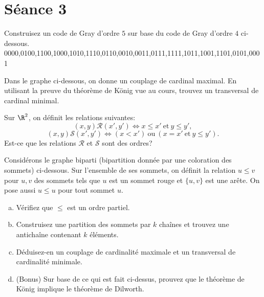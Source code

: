 
\section{Séance 3}

\vspace*{1cm}

\begin{exo}
Construisez un code de Gray d'ordre $5$ sur base du code de Gray d'ordre $4$ ci-dessous.\\
0000,0100,1100,1000,1010,1110,0110,0010,0011,0111,1111,1011,1001,1101,0101,0001
\end{exo}

\vspace*{1cm}


\begin{exo}
Dans le graphe ci-dessous, on donne un couplage de cardinal maximal. En utilisant la preuve du th\'eor\`eme de K\"onig vue au cours, trouvez un transversal de cardinal minimal.
\end{exo}

\begin{figure}[!h]
\begin{center}

\end{center}
\caption{}
\end{figure}


\begin{exo}
Sur $\R^2$, on d\'efinit les relations suivantes:
$$(x,y)\mathcal{R}(x',y') \Leftrightarrow x \leq x' \mathrm{~et~} y \leq y', $$
$$(x,y)\mathcal{S}(x',y') \Leftrightarrow (x < x') \mathrm{~ou~} (x = x' \mathrm{~et~} y \leq y').$$
Est-ce que les relations $\mathcal{R}$ et $\mathcal{S}$ sont des ordres?
\end{exo}

\newpage


\begin{exo}
Consid\'erons le graphe biparti (bipartition donn\'ee par une coloration des sommets) ci-dessous. Sur l'ensemble de ses sommets, on d\'efinit la relation $u\leq v$ pour $u,v$ des sommets tels que $u$ est un sommet rouge et $\{u,v\}$ est une ar\^ete. On pose aussi $u\leq u$ pour tout sommet $u$. \\
\begin{enumerate}[(a)]
\item V\'erifiez que $\leq$ est un ordre partiel.
\item Construisez une partition des sommets par $k$ cha\^ines et trouvez une anticha\^ine contenant $k$ \'el\'ements.
\item D\'eduisez-en un couplage de cardinalit\'e maximale et un transversal de cardinalit\'e minimale. 
\item (Bonus) Sur base de ce qui est fait ci-dessus, prouvez que le th\'eor\`eme de K\"onig implique le th\'eor\`eme de Dilworth.
\end{enumerate}
\end{exo}

